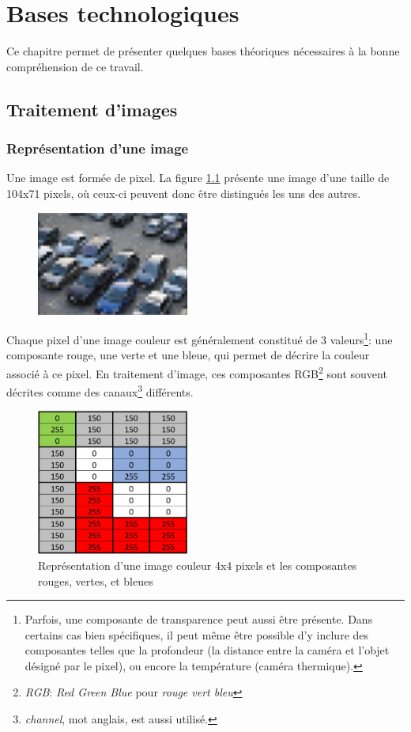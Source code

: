 \chapter{Bases technologiques}
Ce chapitre permet de présenter quelques bases théoriques nécessaires à la bonne compréhension de ce travail. 

\section{Traitement d'images}
\subsection{Représentation d'une image}\label{techno.traitement.repr}
Une image est formée de pixel. La figure \ref{fig:pixels} présente une image d'une taille de 104x71 pixels, où ceux-ci peuvent donc être distingués les uns des autres.

\begin{figure}[ht]
    \includegraphics[width=50mm]{img/bases_technologiques/pixels.png}
    \centering
    \label{fig:pixels} 
\end{figure}

Chaque pixel d'une image couleur est généralement constitué de 3 valeurs\footnote{Parfois, une composante de transparence peut aussi être présente. Dans certains cas bien spécifiques, il peut même être possible d'y inclure des composantes telles que la profondeur (la distance entre la caméra et l'objet désigné par le pixel), ou encore la température (caméra thermique).}: une composante rouge, une verte et une bleue, qui permet de décrire la couleur associé à ce pixel. En traitement d'image, ces composantes RGB\footnote{\textit{RGB}: \textit{Red Green Blue} pour \textit{rouge vert bleu}} sont souvent décrites comme des canaux\footnote{\textit{channel}, mot anglais, est aussi utilisé.} différents.


\begin{figure}[ht]
    \includegraphics[width=50mm]{img/bases_technologiques/images_pixels.png}
    \centering
    \caption{Représentation d'une image couleur 4x4 pixels et les composantes rouges, vertes, et bleues}
\end{figure}

